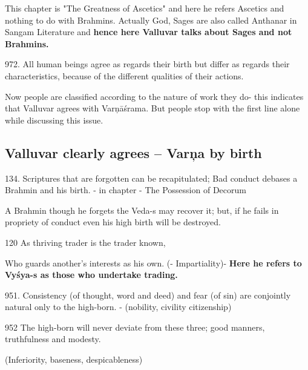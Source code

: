 This chapter is "The Greatness of Ascetics" and here he refers Ascetics and nothing to do with Brahmins. Actually God, Sages are also called Anthanar in Sangam Literature and \textbf{hence here Valluvar talks about Sages and not Brahmins.}

 972. All human beings agree as regards their birth but differ as regards their characteristics, because of the different qualities of their actions.

Now people are classified according to the nature of work they do- this indicates that Valluvar agrees with Varņāśrama. But people stop with the first line alone while discussing this issue.


\subsection*{Valluvar clearly agrees – Varņa by birth}

134. Scriptures that are forgotten can be recapitulated; Bad conduct debases a Brahmin and his birth. - in chapter - The Possession of Decorum

A Brahmin though he forgets the Veda-s may recover it; but, if he fails in propriety of conduct even his high birth will be destroyed.

120 As thriving trader is the trader known,

Who guards another's interests as his own. (- Impartiality)- \textbf{Here he refers to Vyśya-s as those who undertake trading.}

951. Consistency (of thought, word and deed) and fear (of sin) are conjointly natural only to the high-born. -  (nobility, civility citizenship)

952 The high-born will never deviate from these three; good manners, truthfulness and modesty. 

 (Inferiority, baseness, despicableness)

